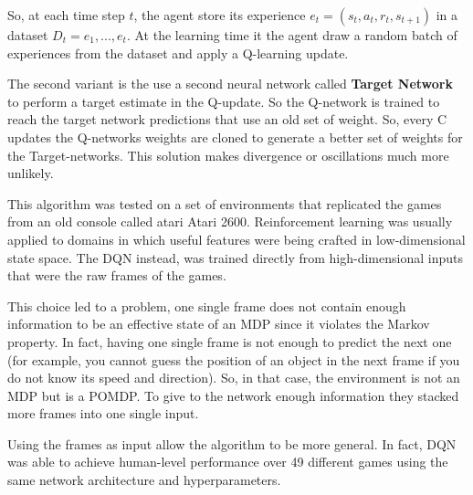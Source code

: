 So, at each time step $t$, the agent store its experience $e_t=(s_t,a_t,r_t,s_{t+1})$ in a dataset $D_t={e_1, ... ,e_t}$.
At the learning time it the agent draw a random batch of experiences from the dataset and apply a Q-learning update.  

The second variant is the use a second neural network called \textbf{Target Network} to perform a target estimate in the Q-update.
So the Q-network is trained to reach the target network predictions that use an old set of weight.
So, every C updates the Q-networks weights are cloned to generate a better set of weights for the Target-networks.
This solution makes divergence or oscillations much more unlikely.

This algorithm was tested on a set of environments that replicated the games from an old console called atari Atari 2600.
Reinforcement learning was usually applied to domains in which useful features were being crafted in low-dimensional state space.
The DQN instead, was trained directly from high-dimensional inputs that were the raw frames of the games. 

This choice led to a problem, one single frame does not contain enough information to be an effective state of an MDP since it violates the Markov property.
In fact, having one single frame is not enough to
predict the next one (for example, you cannot guess the position of an object in the next frame if you do not know its speed and direction).
So, in that case, the environment is not an MDP but is a POMDP.
To give to the network enough information they stacked more frames into one single input.

Using the frames as input allow the algorithm to be more general.
In fact, DQN was able to achieve human-level performance over 49 different games using the same network architecture and hyperparameters.

